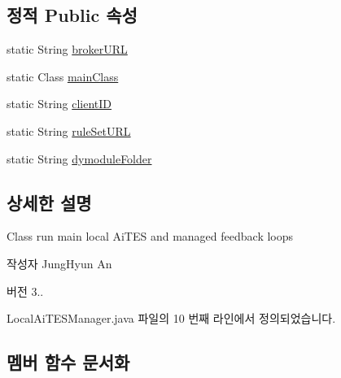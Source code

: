\subsection*{정적 Public 속성}
\begin{DoxyCompactItemize}
\item 
static String \mbox{\hyperlink{classcom_1_1github_1_1aites_1_1framework_1_1framework_1_1_local_ai_t_e_s_manager_a479caac5cbf611b89738b88e7978c615}{broker\+U\+RL}}
\item 
static Class \mbox{\hyperlink{classcom_1_1github_1_1aites_1_1framework_1_1framework_1_1_local_ai_t_e_s_manager_a540298711c4e1c659aaf1f4bdd90c41d}{main\+Class}}
\item 
static String \mbox{\hyperlink{classcom_1_1github_1_1aites_1_1framework_1_1framework_1_1_local_ai_t_e_s_manager_a8a35353b5b0725d6c560935e892b66a6}{client\+ID}}
\item 
static String \mbox{\hyperlink{classcom_1_1github_1_1aites_1_1framework_1_1framework_1_1_local_ai_t_e_s_manager_ab0bf73d6d36ea00b62b70e9544a0e6b4}{rule\+Set\+U\+RL}}
\item 
static String \mbox{\hyperlink{classcom_1_1github_1_1aites_1_1framework_1_1framework_1_1_local_ai_t_e_s_manager_ab732a58aeff4bc92c2385f98a417fe3a}{dymodule\+Folder}}
\end{DoxyCompactItemize}


\subsection{상세한 설명}
Class run main local Ai\+T\+ES and managed feedback loops 

\begin{DoxyAuthor}{작성자}
Jung\+Hyun An 
\end{DoxyAuthor}
\begin{DoxyVersion}{버전}
3.. 
\end{DoxyVersion}


Local\+Ai\+T\+E\+S\+Manager.\+java 파일의 10 번째 라인에서 정의되었습니다.



\subsection{멤버 함수 문서화}
\mbox{\label{classcom_1_1github_1_1aites_1_1framework_1_1framework_1_1_local_ai_t_e_s_manager_a2bc882848bd635b1a807bb1441df999b}} 
